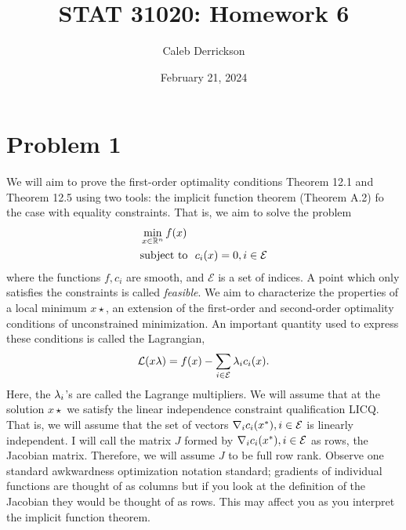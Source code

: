 

\title{STAT 31020: Homework 6}
\author{Caleb Derrickson}
\date{February 21, 2024}


\onehalfspacing
\maketitle
\allowdisplaybreaks

\tableofcontents

\newcommand{\scE}{\mathcal{E}}
\newcommand{\scL}{\mathcal{L}}
\newcommand{\scF}{\mathcal{F}}
\newcommand{\scJ}{\mathcal{J}}
\newpage
\section{Problem 1}
We will aim to prove the first-order optimality conditions Theorem 12.1 and Theorem 12.5 using two tools: the implicit function theorem (Theorem A.2) fo the case with equality constraints. That is, we aim to solve the problem
\begin{align*}
    &\min_{x \in \R^n} f(x)\\
    &\text{subject to } \ c_i(x) = 0, i \in \scE
\end{align*}
where the functions $f, c_i$ are smooth, and $\scE$ is a set of indices. A point which only satisfies the constraints is called \textit{feasible}. We aim to characterize the properties of a local minimum $x\star$, an extension of the first-order and second-order optimality conditions of unconstrained minimization. An important quantity used to express these conditions is called the Lagrangian,
\[\scL (x \lm) = f(x) - \sum_{i \in \scE} \lm_i c_i(x).\]
Here, the $\mathrm{\lambda}_i$'s are called the Lagrange multipliers. We will assume that at the solution $x\star$ we satisfy the linear independence constraint qualification LICQ. That is, we will assume that the set of vectors $\grad_i c_i(x\star), i \in \scE$ is linearly independent. I will call the matrix $J$ formed by  $\grad_i c_i(x\star), i \in \scE$ as rows, the Jacobian matrix. Therefore, we will assume $J$ to be full row rank. Observe one standard awkwardness optimization notation standard; gradients of individual functions are thought of as columns but if you look at the definition of the Jacobian they would be 
thought of as rows. This may affect you as you interpret the implicit function theorem.

\newpage
